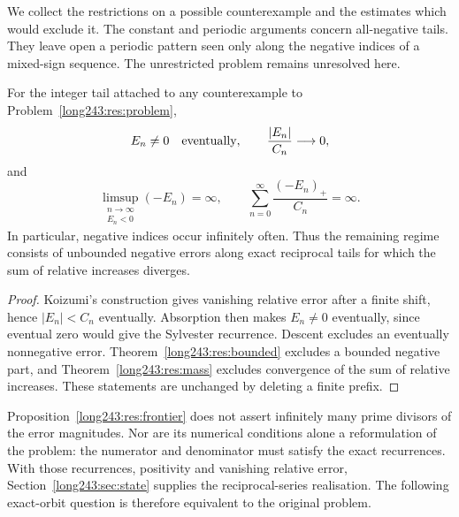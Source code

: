 \documentclass[11pt]{article}
\begin{document}
We collect the restrictions on a possible counterexample and the
estimates which would exclude it. The constant and periodic arguments
concern all-negative tails. They leave open a periodic pattern seen
only along the negative indices of a mixed-sign sequence. The
unrestricted problem remains unresolved here.

\begin{proposition}\label{long243:res:frontier}
For the integer tail attached to any counterexample to
Problem~\ref{long243:res:problem},
\[
 E_n\ne0\quad\hbox{eventually},\qquad
 \frac{|E_n|}{C_n}\longrightarrow0,
\]
and
\[
 \limsup_{\substack{n\to\infty\\E_n<0}}(-E_n)=\infty,
 \qquad
 \sum_{n=0}^{\infty}\frac{(-E_n)_+}{C_n}=\infty .
\]
In particular, negative indices occur infinitely often.  Thus the remaining
regime consists of unbounded negative errors along exact reciprocal tails for which
the sum of relative increases diverges.
\end{proposition}

\begin{proof}
Koizumi's construction gives vanishing relative error after a finite
shift, hence $|E_n|<C_n$ eventually.
Absorption then makes $E_n\ne0$ eventually,
since eventual zero would give the Sylvester recurrence.  Descent excludes an
eventually nonnegative error.  Theorem~\ref{long243:res:bounded} excludes a bounded
negative part, and Theorem~\ref{long243:res:mass} excludes convergence of the sum of relative increases.  These statements are unchanged by deleting a finite prefix.
\end{proof}



Proposition~\ref{long243:res:frontier} does not assert infinitely many
prime divisors of the error magnitudes. Nor are its numerical conditions
alone a reformulation of the problem: the numerator and denominator
must satisfy the exact recurrences. With those recurrences, positivity
and vanishing relative error, Section~\ref{long243:sec:state} supplies
the reciprocal-series realisation. The following exact-orbit question
is therefore equivalent to the original problem.
\end{document}

